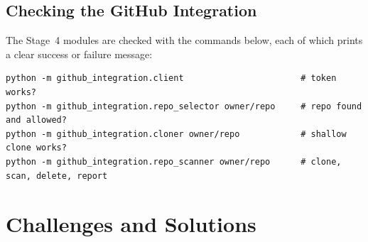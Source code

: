 \documentclass[12pt,a4paper]{article}
\begin{document}
\subsection{Checking the GitHub Integration}

The Stage~4 modules are checked with the commands below, each of which prints a clear success or failure message:

\begin{lstlisting}[language={},caption={Commands used to check each GitHub module},label={lst:ghcheck}]
python -m github_integration.client                       # token works?
python -m github_integration.repo_selector owner/repo     # repo found and allowed?
python -m github_integration.cloner owner/repo            # shallow clone works?
python -m github_integration.repo_scanner owner/repo      # clone, scan, delete, report
\end{lstlisting}

\section{Challenges and Solutions}
\end{document}
